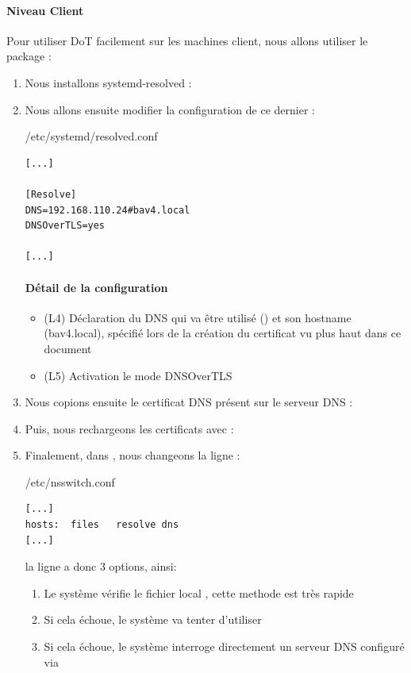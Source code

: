 \documentclass{article}
\begin{document}
\paragraph{Niveau Client\\}

Pour utiliser DoT facilement sur les machines client, nous allons utiliser le package  :

\begin{enumerate}
	\item Nous installons systemd-resolved : 
	\item Nous allons ensuite modifier la configuration de ce dernier :
\begin{configbox}{/etc/systemd/resolved.conf}
\begin{lstlisting}
[...]

[Resolve]
DNS=192.168.110.24#bav4.local
DNSOverTLS=yes

[...]
\end{lstlisting}
\end{configbox}
\paragraph{Détail de la configuration}
\begin{itemize}
	\item (L4) Déclaration du DNS qui va être utilisé () et son hostname (bav4.local), spécifié lors de la création du certificat vu plus haut dans ce document
	\item (L5) Activation le mode DNSOverTLS
\end{itemize}
	\item Nous copions ensuite le certificat DNS  présent sur le serveur DNS :
	\item Puis, nous rechargeons les certificats avec : 
	\item Finalement, dans , nous changeons la ligne  :  
\begin{configbox}{/etc/nsswitch.conf}
\begin{lstlisting}
[...]
hosts:	files	resolve	dns
[...]
\end{lstlisting}
\end{configbox}
la ligne  a donc 3 options, ainsi:
\begin{enumerate}
	\item Le système vérifie le fichier local , cette methode est très rapide
	\item Si cela échoue, le système va tenter d'utiliser 
	\item Si cela échoue, le système interroge directement un serveur DNS configuré via 
\end{enumerate}
\end{enumerate}
\end{document}
